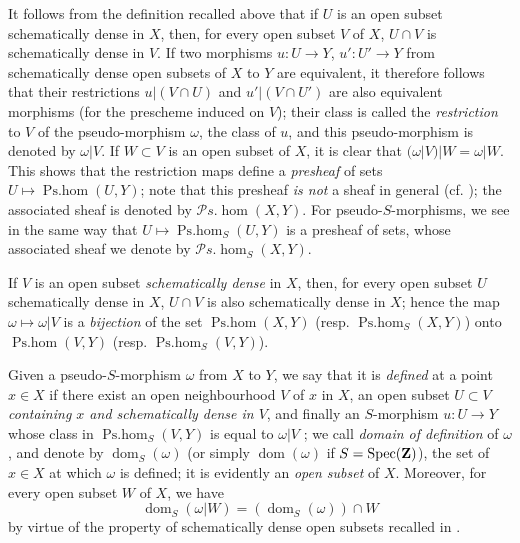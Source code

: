 \begin{env}[20.2.2]\label{IV.20.2.2}
It follows from the definition recalled above that if $U$ is an open subset schematically dense in $X$, then, for every open subset $V$ of $X$, $U\cap V$ is schematically dense in $V$.
If two morphisms $u:U\to Y$, $u':U'\to Y$ from schematically dense open subsets of $X$ to $Y$ are equivalent, it therefore follows that their restrictions $u|(V\cap U)$ and $u'|(V\cap U')$ are also equivalent morphisms (for the prescheme induced on $V$); their class is called the \emph{restriction} to $V$ of the pseudo-morphism $\omega$, the class of $u$, and this pseudo-morphism is denoted by $\omega|V$.
If $W\subset V$ is an open subset of $X$, it is clear that $(\omega|V)|W=\omega|W$.
This shows that the restriction maps define a \emph{presheaf} of sets $U\mapsto\operatorname{Ps.hom}(U,Y)$; note that this presheaf \emph{is not} a sheaf in general (cf. ); the associated sheaf is denoted by $\mathscr{P}\!s.\!\operatorname{hom}(X,Y)$.
For pseudo-$S$-morphisms, we see in the same way that $U\mapsto\operatorname{Ps.hom}_S(U,Y)$ is a presheaf of sets, whose associated sheaf we denote by $\mathscr{P}\!s.\!\operatorname{hom}_S(X,Y)$.

If $V$ is an open subset \emph{schematically dense} in $X$, then, for every open subset $U$ schematically dense in $X$, $U\cap V$ is also schematically dense in $X$; hence the map $\omega\mapsto\omega|V$ is a \emph{bijection} of the set $\operatorname{Ps.hom}(X,Y)$ (resp. $\operatorname{Ps.hom}_S(X,Y)$) onto $\operatorname{Ps.hom}(V,Y)$ (resp. $\operatorname{Ps.hom}_S(V,Y)$).
\end{env}

\begin{env}[20.2.3]\label{IV.20.2.3}
Given a pseudo-$S$-morphism $\omega$ from $X$ to $Y$, we say that it is \emph{defined} at a point $x\in X$ if there exist an open neighbourhood $V$ of $x$ in $X$, an open subset $U\subset V$ \emph{containing $x$ and schematically dense in $V$}, and finally an $S$-morphism $u:U\to Y$ whose class in $\operatorname{Ps.hom}_S(V,Y)$ is equal to $\omega|V$ ; we call \emph{domain of definition} of $\omega$, and denote by $\operatorname{dom}_S(\omega)$ (or simply $\operatorname{dom}(\omega)$ if $S=\operatorname{Spec}(\mathbf{Z})$), the set of $x\in X$ at which $\omega$ is defined; it is evidently an \emph{open subset} of $X$.
Moreover, for every open subset $W$ of $X$, we have
\[
\label{IV.20.2.3.1}
  \operatorname{dom}_S(\omega|W)=(\operatorname{dom}_S(\omega))\cap W
  \tag{20.2.3.1}
\]
by virtue of the property of schematically dense open subsets recalled in .
\end{env}


